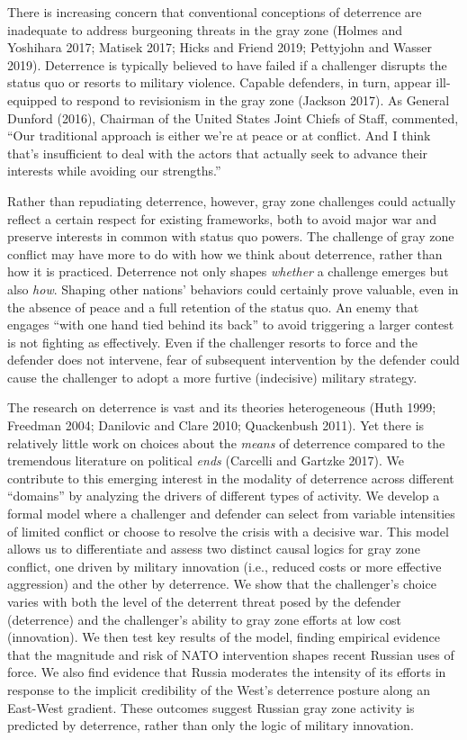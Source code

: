 \documentclass[
]{article}
\begin{document}
There is increasing concern that conventional conceptions of deterrence are inadequate to address burgeoning threats in the gray zone (Holmes and Yoshihara 2017; Matisek 2017; Hicks and Friend 2019; Pettyjohn and Wasser 2019). Deterrence is typically believed to have failed if a challenger disrupts the status quo or resorts to military violence. Capable defenders, in turn, appear ill-equipped to respond to revisionism in the gray zone (Jackson 2017). As General Dunford (2016), Chairman of the United States Joint Chiefs of Staff, commented, ``Our traditional approach is either we're at peace or at conflict. And I think that's insufficient to deal with the actors that actually seek to advance their interests while avoiding our strengths.''

Rather than repudiating deterrence, however, gray zone challenges could actually reflect a certain respect for existing frameworks, both to avoid major war and preserve interests in common with status quo powers. The challenge of gray zone conflict may have more to do with how we think about deterrence, rather than how it is practiced. Deterrence not only shapes \emph{whether} a challenge emerges but also \emph{how}. Shaping other nations' behaviors could certainly prove valuable, even in the absence of peace and a full retention of the status quo. An enemy that engages ``with one hand tied behind its back'' to avoid triggering a larger contest is not fighting as effectively. Even if the challenger resorts to force and the defender does not intervene, fear of subsequent intervention by the defender could cause the challenger to adopt a more furtive (indecisive) military strategy.

The research on deterrence is vast and its theories heterogeneous (Huth 1999; Freedman 2004; Danilovic and Clare 2010; Quackenbush 2011). Yet there is relatively little work on choices about the \emph{means} of deterrence compared to the tremendous literature on political \emph{ends} (Carcelli and Gartzke 2017). We contribute to this emerging interest in the modality of deterrence across different ``domains'' by analyzing the drivers of different types of activity. We develop a formal model where a challenger and defender can select from variable intensities of limited conflict or choose to resolve the crisis with a decisive war. This model allows us to differentiate and assess two distinct causal logics for gray zone conflict, one driven by military innovation (i.e., reduced costs or more effective aggression) and the other by deterrence. We show that the challenger's choice varies with both the level of the deterrent threat posed by the defender (deterrence) and the challenger's ability to gray zone efforts at low cost (innovation). We then test key results of the model, finding empirical evidence that the magnitude and risk of NATO intervention shapes recent Russian uses of force. We also find evidence that Russia moderates the intensity of its efforts in response to the implicit credibility of the West's deterrence posture along an East-West gradient. These outcomes suggest Russian gray zone activity is predicted by deterrence, rather than only the logic of military innovation.
\end{document}
